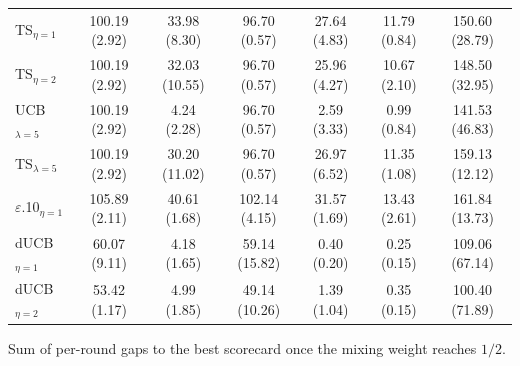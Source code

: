 \begin{table}[p]
{\begin{tabular}{lcccccc}
TS$_{\eta=1}$ & 100.19 (2.92) & 33.98 (8.30) & 96.70 (0.57) & 27.64 (4.83) & 11.79 (0.84) & 150.60 (28.79) \\
TS$_{\eta=2}$ & 100.19 (2.92) & 32.03 (10.55) & 96.70 (0.57) & 25.96 (4.27) & 10.67 (2.10) & 148.50 (32.95) \\
UCB$_{\lambda=5}$ & 100.19 (2.92) & 4.24 (2.28) & 96.70 (0.57) & 2.59 (3.33) & 0.99 (0.84) & 141.53 (46.83) \\
TS$_{\lambda=5}$ & 100.19 (2.92) & 30.20 (11.02) & 96.70 (0.57) & 26.97 (6.52) & 11.35 (1.08) & 159.13 (12.12) \\
$\varepsilon$.10$_{\eta=1}$ & 105.89 (2.11) & 40.61 (1.68) & 102.14 (4.15) & 31.57 (1.69) & 13.43 (2.61) & 161.84 (13.73) \\
dUCB$_{\eta=1}$ & 60.07 (9.11) & 4.18 (1.65) & 59.14 (15.82) & 0.40 (0.20) & 0.25 (0.15) & 109.06 (67.14) \\
dUCB$_{\eta=2}$ & 53.42 (1.17) & 4.99 (1.85) & 49.14 (10.26) & 1.39 (1.04) & 0.35 (0.15) & 100.40 (71.89) \\
\bottomrule
\end{tabular}}
\parbox{\textwidth}{\scriptsize Sum of per-round gaps to the best scorecard once the mixing weight reaches $1/2$.}
\end{table}
\clearpage

